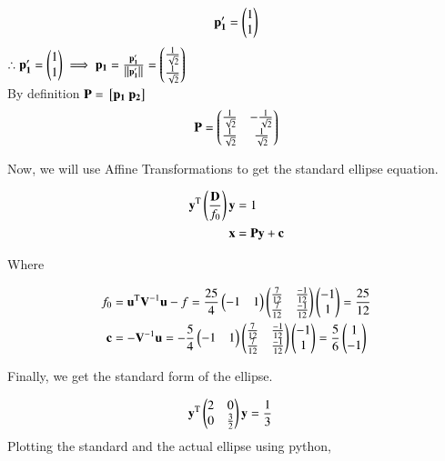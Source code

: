 \documentclass[journal]{IEEEtran}
\begin{document}
\begin{align}
	\mathbf{p_1^\prime} &=  \begin{pmatrix}1 \\ 1\end{pmatrix} \\
\end{align} 
$\therefore \mathbf{p_1^\prime}  = \begin{pmatrix}1 \\ 1\end{pmatrix} \implies \mathbf{p_1} = \frac{\mathbf{p_1^\prime} }{\left\lVert\mathbf{p_1^\prime}\right\rVert}  = \begin{pmatrix} \frac{1}{\sqrt{2}} \\ \frac{1}{\sqrt{2}}\end{pmatrix}$ \\
By definition $\mathbf{P} = {}\left[\mathbf{p_1} ~ \mathbf{p_2}\right]$ \\ 

\begin{align}
	\mathbf{P} = \begin{pmatrix} \frac{1}{\sqrt{2}} & -\frac{1}{\sqrt{2}} \\ \frac{1}{\sqrt{2}} & \frac{1}{\sqrt{2}} \end{pmatrix} \label{Rdef}
\end{align}

Now, we will use Affine Transformations to get the standard ellipse equation.

\begin{align}
	\mathbf{y}^\text{T}\left(\frac{\mathbf{D}}{f_0}\right)\mathbf{y} &= 1\\
	\mathbf{x} &= \mathbf{Py} + \mathbf{c} \label{t1}\\
\end{align}

Where 

\begin{align}
	f_0 &= \mathbf{u}^\text{T}\mathbf{V}^{-1}\mathbf{u} - f  = \frac{25}{4} \begin{pmatrix}-1 & 1\end{pmatrix} \begin{pmatrix}\frac{7}{12} & \frac{-1}{12} \\ \frac{7}{12} & \frac{-1}{12}\end{pmatrix}  \begin{pmatrix}-1 \\ 1\end{pmatrix}  = \frac{25}{12}\\
	\mathbf{c} &= -\mathbf{V}^{-1}\mathbf{u} = -\frac{5}{4}  \begin{pmatrix}-1 & 1\end{pmatrix} \begin{pmatrix}\frac{7}{12} & \frac{-1}{12} \\ \frac{7}{12} & \frac{-1}{12}\end{pmatrix}\begin{pmatrix} -1 \\ 1\end{pmatrix} = \frac{5}{6}  \begin{pmatrix} 1 \\ -1\end{pmatrix}
\end{align}

Finally, we get the standard form of the ellipse.

\begin{align}
		\mathbf{y}^\text{T}\begin{pmatrix}2 & 0 \\ 0 & \frac{3}{2}\end{pmatrix}\mathbf{y} &= \frac{1}{3}
\end{align}
Plotting the standard and the actual ellipse using python,
\end{document}
